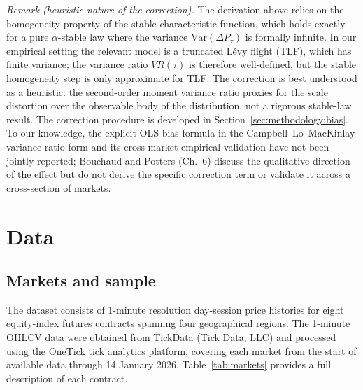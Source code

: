 \documentclass[12pt,a4paper]{article}
\begin{document}
\textit{Remark (heuristic nature of the correction).}
The derivation above relies on the homogeneity property of the stable
characteristic function, which holds exactly for a pure $\alpha$-stable
law where the variance $\mathrm{Var}(\Delta P_\tau)$ is formally infinite.
In our empirical setting the relevant model is a truncated Lévy flight (TLF),
which has finite variance; the variance ratio $VR(\tau)$ is therefore
well-defined, but the stable homogeneity step is only approximate for TLF.
The correction is best understood as a heuristic: the second-order moment
variance ratio proxies for the scale distortion over the observable body of
the distribution, not a rigorous stable-law result.
The correction
procedure is developed in Section~\ref{sec:methodology:bias}. To our knowledge, the explicit OLS bias formula in the
Campbell--Lo--MacKinlay variance-ratio form and its cross-market empirical
validation have not been jointly reported; Bouchaud and Potters \cite{BouchaudPotters2003}
(Ch.~6) discuss the qualitative direction of the effect but do not derive
the specific correction term or validate it across a cross-section of markets.


\section{Data}
\label{sec:data}

\subsection{Markets and sample}
\label{sec:data:markets}

The dataset consists of 1-minute resolution day-session price histories for
eight equity-index futures contracts spanning four geographical regions. The
1-minute OHLCV data were obtained from TickData (Tick Data, LLC) and processed
using the OneTick tick analytics platform, covering each market from the start
of available data through 14 January 2026. Table~\ref{tab:markets} provides
a full description of each contract.
\end{document}
